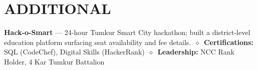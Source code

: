 \documentclass[a4paper,10pt]{article}
\newcommand{\dmnd}{\,{\color{muted}$\diamond$}\,}
\begin{document}
\section{ADDITIONAL}
\noindent\textbf{Hack-o-Smart} --- 24-hour Tumkur Smart City hackathon; built a district-level
education platform surfacing seat availability and fee details. \dmnd
\textbf{Certifications:} SQL (CodeChef), Digital Skills (HackerRank) \dmnd
\textbf{Leadership:} NCC Rank Holder, 4 Kar Tumkur Battalion
\end{document}
